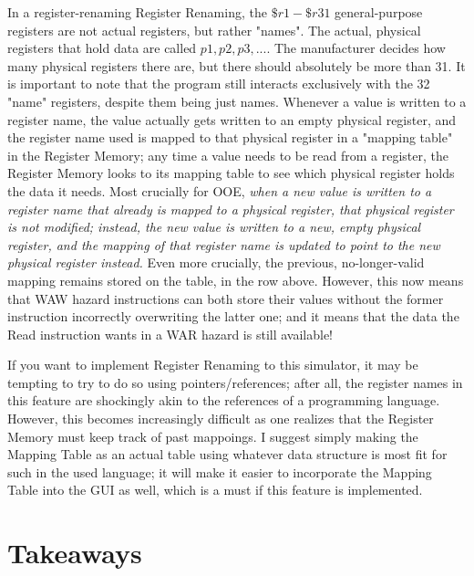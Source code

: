 \documentclass[12pt,twoside]{reedthesis}
\begin{document}
In a register-renaming Register Renaming, the $\$r1 - \$r31$ general-purpose registers are not actual registers, but rather "names". The actual, physical registers that hold data are called $p1, p2, p3, ...$. The manufacturer decides how many physical registers there are, but there should absolutely be more than 31. It is important to note that the program still interacts exclusively with the 32 "name" registers, despite them being just names. Whenever a value is written to a register name,  the value actually gets written to an empty physical register, and the register name used is mapped to that physical register in a "mapping table" in the Register Memory; any time a value needs to be read from a register, the Register Memory looks to its mapping table to see which physical register holds the data it needs. Most crucially for OOE, \textit{when a new value is written to a register name that already is mapped to a physical register, that physical register is not modified; instead, the new value is written to a new, empty physical register, and the mapping of that register name is updated to point to the new physical register instead.} Even more crucially, the previous, no-longer-valid mapping remains stored on the table, in the row above. However, this now means that WAW hazard instructions can both store their values without the former instruction incorrectly overwriting the latter one; and it means that the data the Read instruction wants in a WAR hazard is still available!

If you want to implement Register Renaming to this simulator, it may be tempting to try to do so using pointers/references; after all, the register names in this feature are shockingly akin to the references of a programming language. However, this becomes increasingly difficult as one realizes that the Register Memory must keep track of past mappoings. I suggest simply making the Mapping Table as an actual table using whatever data structure is most fit for such in the used language; it will make it easier to incorporate the Mapping Table into the GUI as well, which is a must if this feature is implemented.


\section{Takeaways}
\end{document}

